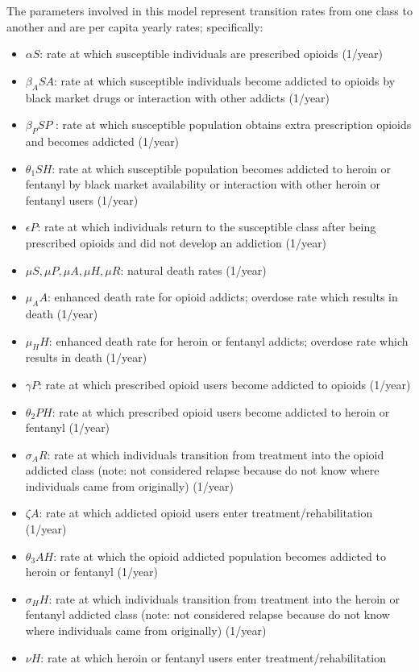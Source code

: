 \documentclass[12pt]{article}
\begin{document}
The parameters involved in this model represent transition rates from one class to another and are per capita yearly rates; specifically: 
\begin{itemize}
\item $\alpha S$: rate at which susceptible individuals are prescribed opioids (1/year)
\item $\beta_{A} SA$: rate at which susceptible individuals become addicted to opioids by black market drugs or interaction with other addicts (1/year)
\item $\beta_{P} SP$ : rate at which susceptible population obtains extra prescription opioids and becomes addicted  (1/year)
\item $\theta_1 SH$: rate at which susceptible population becomes addicted to heroin or fentanyl by black market availability or interaction with other heroin or fentanyl users  (1/year)
\item $\epsilon P$: rate at which individuals return to the susceptible class after being prescribed opioids and did not develop an addiction (1/year) 
\item $\mu S, \mu P, \mu A, \mu H, \mu R$: natural death rates (1/year)
\item $\mu_A A$: enhanced death rate for opioid addicts; overdose rate which results in death (1/year)
\item $\mu_H H$: enhanced death rate for heroin or fentanyl addicts; overdose rate which results in death (1/year)
\item $\gamma P$: rate at which prescribed opioid users become addicted to opioids (1/year)
\item $\theta_2 PH$: rate at which prescribed opioid users become addicted to heroin or fentanyl (1/year)
\item $\sigma_A R$: rate at which individuals transition from treatment into the opioid addicted class (note: not considered relapse because do not know where individuals came from originally) (1/year)
\item $\zeta A$: rate at which addicted opioid users enter treatment/rehabilitation (1/year)
\item $\theta_3 AH$: rate at which the opioid addicted population becomes addicted to heroin or fentanyl  (1/year)
\item$\sigma_H H$: rate at which individuals transition from treatment into the heroin or fentanyl addicted class (note: not considered relapse because do not know where individuals came from originally) (1/year)
\item $\nu H$: rate at which heroin or fentanyl users enter treatment/rehabilitation 
\end{itemize}
\end{document}
